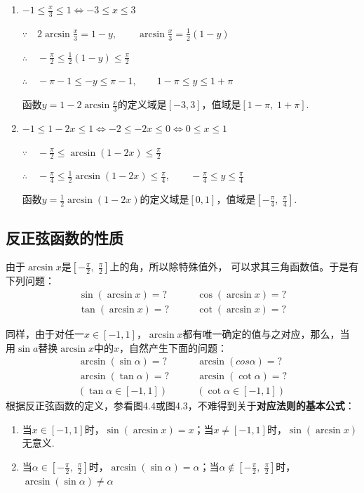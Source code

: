 \begin{solution}
\begin{enumerate}[(1)]
    \item $-1\le \frac{x}{3}\le 1\Longleftrightarrow -3\le x\le 3$

$\because\quad 2\arcsin\frac{x}{3}=1-y,\qquad \arcsin \frac{x}{3}=\frac{1}{2}(1-y)$

$\therefore\quad -\frac{\pi}{2}\le \frac{1}{2}(1-y)\le \frac{\pi}{2}$

$\therefore\quad -\pi-1\le -y\le \pi-1,\qquad 1-\pi\le y\le 1+\pi$

函数$y=1-2\arcsin \frac{x}{3}$的定义域是$[-3,3]$，值域是$[1-\pi,\; 1+\pi]$.

\item $-1\le 1-2x\le 1 \Longleftrightarrow -2\le -2x\le 0 \Longleftrightarrow 0\le x\le 1$

$\because\quad -\frac{\pi}{2}\le \arcsin(1-2x)\le \frac{\pi}{2}$

$\therefore\quad -\frac{\pi}{4}\le \frac{1}{2}\arcsin(1-2x)\le \frac{\pi}{4},\qquad -\frac{\pi}{4}\le y\le \frac{\pi}{4}$

函数$y=\frac{1}{2}\arcsin(1-2x)$的定义域是$[0,1]$，值域是$\left[-\frac{\pi}{4},\; \frac{\pi}{4}\right]$.
\end{enumerate}
\end{solution}

\subsection{反正弦函数的性质}

由于$\arcsin x$是$\left[-\frac{\pi}{2},\; \frac{\pi}{2}\right]$上的角，所以除特殊值外，
可以求其三角函数值。于是有下列问题：
\[\begin{split}
\sin(\arcsin x)=?&\qquad \cos(\arcsin x)=?\\
\tan(\arcsin x)=?&\qquad \cot(\arcsin x)=?    
\end{split}\]

同样，由于对任一$x\in[-1,1]$，$\arcsin x$都有唯一确定的值与之对应，那么，当用$\sin a$替换$\arcsin x$中的$x$，自然产生下面的问题：
\[\begin{split}
 \arcsin(\sin \alpha)=?&\qquad \arcsin(cos\alpha)=?\\
\arcsin(\tan\alpha)=? &\qquad \arcsin(\cot\alpha)=?\\
(\tan\alpha \in[-1,1]) &\qquad (\cot\alpha \in[-1,1]) 
\end{split} \]
根据反正弦函数的定义，参看图4.4或图4.3，不难得到关于\textbf{对应法则的基本公式}：
\begin{enumerate}[(1)]
    \item 当$x\in[-1,1]$时，$\sin(\arcsin x)=x$；当$x\ne [-1,1]$时，$\sin(\arcsin x)$无意义.
    \item 当$\alpha\in\left[-\frac{\pi}{2},\; \frac{\pi}{2}\right]$时，$\arcsin(\sin\alpha)=\alpha$；当$\alpha\notin\left[-\frac{\pi}{2},\; \frac{\pi}{2}\right]$时，$\arcsin(\sin\alpha)\ne \alpha$
\end{enumerate}

